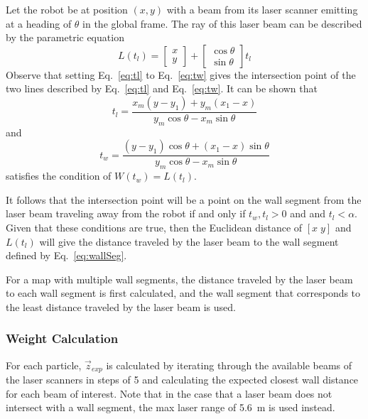 \documentclass[conference]{../IEEEtran}
\begin{document}
Let the robot be at position $(x,y)$ with a beam from its laser scanner emitting at a
heading of $\theta$ in the global frame.  The ray of this laser beam can be described by
the parametric equation
\begin{equation}
  L(t_l) =
  \begin{bmatrix}
    x\\y
    \end{bmatrix} +
    \begin{bmatrix}
    \cos \theta\\
    \sin \theta
  \end{bmatrix} t_l
  \label{eq:laser}
\end{equation}
Observe that setting Eq.~\ref{eq:tl} to Eq.~\ref{eq:tw} gives the intersection point of
the two lines described by Eq.~\ref{eq:tl} and Eq.~\ref{eq:tw}. It can be shown that
\begin{equation}
  t_l = \frac{x_m(y-y_1)+y_m(x_1-x)}{y_m\cos\theta - x_m\sin\theta}
  \label{eq:tl}
\end{equation}
and
\begin{equation}
  t_w = \frac{(y-y_1)\cos\theta + (x_1-x)\sin\theta}{y_m\cos\theta-x_m\sin\theta}
\label{eq:tw}
\end{equation}
satisfies the condition of $W(t_w) = L(t_l)$.

It follows that the intersection point will be a point on the wall segment from the laser
beam traveling away from the robot if and only if $t_w, t_l > 0$ and and $t_l < \alpha$.
Given that these conditions are true, then the Euclidean distance of $[x\;y]$ and $L(t_l)$
will give the distance traveled by the laser beam to the wall segment defined by
Eq.~\ref{eq:wallSeg}.

For a map with multiple wall segments, the distance traveled by the laser beam to each
wall segment is first calculated, and the wall segment that corresponds to the least
distance traveled by the laser beam is used.

\subsubsection{Weight Calculation}

For each particle, $\vec{z}_{exp}$ is calculated by iterating through the available beams
of the laser scanners in steps of 5 and calculating the expected closest wall distance for
each beam of interest. Note that in the case that a laser beam does not intersect with a
wall segment, the max laser range of \SI{5.6}{\meter} is used instead.
\end{document}
